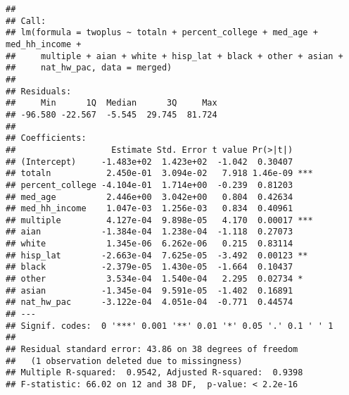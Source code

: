 \documentclass[
]{article}
\begin{document}
\begin{verbatim}
## 
## Call:
## lm(formula = twoplus ~ totaln + percent_college + med_age + med_hh_income + 
##     multiple + aian + white + hisp_lat + black + other + asian + 
##     nat_hw_pac, data = merged)
## 
## Residuals:
##     Min      1Q  Median      3Q     Max 
## -96.580 -22.567  -5.545  29.745  81.724 
## 
## Coefficients:
##                   Estimate Std. Error t value Pr(>|t|)    
## (Intercept)     -1.483e+02  1.423e+02  -1.042  0.30407    
## totaln           2.450e-01  3.094e-02   7.918 1.46e-09 ***
## percent_college -4.104e-01  1.714e+00  -0.239  0.81203    
## med_age          2.446e+00  3.042e+00   0.804  0.42634    
## med_hh_income    1.047e-03  1.256e-03   0.834  0.40961    
## multiple         4.127e-04  9.898e-05   4.170  0.00017 ***
## aian            -1.384e-04  1.238e-04  -1.118  0.27073    
## white            1.345e-06  6.262e-06   0.215  0.83114    
## hisp_lat        -2.663e-04  7.625e-05  -3.492  0.00123 ** 
## black           -2.379e-05  1.430e-05  -1.664  0.10437    
## other            3.534e-04  1.540e-04   2.295  0.02734 *  
## asian           -1.345e-04  9.591e-05  -1.402  0.16891    
## nat_hw_pac      -3.122e-04  4.051e-04  -0.771  0.44574    
## ---
## Signif. codes:  0 '***' 0.001 '**' 0.01 '*' 0.05 '.' 0.1 ' ' 1
## 
## Residual standard error: 43.86 on 38 degrees of freedom
##   (1 observation deleted due to missingness)
## Multiple R-squared:  0.9542, Adjusted R-squared:  0.9398 
## F-statistic: 66.02 on 12 and 38 DF,  p-value: < 2.2e-16
\end{verbatim}
\end{document}
